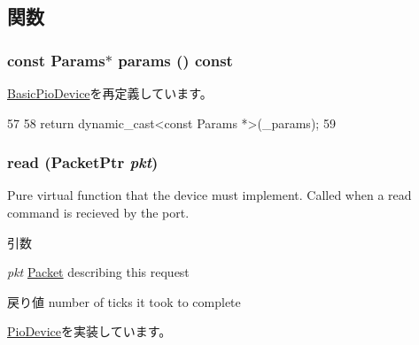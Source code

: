\subsection{関数}
\hypertarget{classMmDisk_acd3c3feb78ae7a8f88fe0f110a718dff}{
\subsubsection[{params}]{\setlength{\rightskip}{0pt plus 5cm}const {\bf Params}$\ast$ params () const}}
\label{classMmDisk_acd3c3feb78ae7a8f88fe0f110a718dff}


\hyperlink{classBasicPioDevice_acd3c3feb78ae7a8f88fe0f110a718dff}{BasicPioDevice}を再定義しています。


\begin{DoxyCode}
57     {
58         return dynamic_cast<const Params *>(_params);
59     }
\end{DoxyCode}
\hypertarget{classMmDisk_a613ec7d5e1ec64f8d21fec78ae8e568e}{
\subsubsection[{read}]{ read ({\bf PacketPtr} {\em pkt})}}
\label{classMmDisk_a613ec7d5e1ec64f8d21fec78ae8e568e}
Pure virtual function that the device must implement. Called when a read command is recieved by the port. 
\begin{DoxyParams}{引数}
\item[{\em pkt}]\hyperlink{classPacket}{Packet} describing this request \end{DoxyParams}
\begin{DoxyReturn}{戻り値}
number of ticks it took to complete 
\end{DoxyReturn}


\hyperlink{classPioDevice_a842312590432036092c422c87a442358}{PioDevice}を実装しています。


